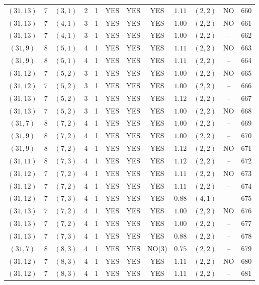 \begin{longtable}{|c|c|c|c|c|c|c|c|c|c|c|c|}
$(31,13)$ & 7 & $(3,1)$ & 2 & 1 & YES & YES & YES & $1.11$ & $(2,2)$ & NO & 660\\
$(31,13)$ & 7 & $(4,1)$ & 3 & 1 & YES & YES & YES & $1.00$ & $(2,2)$ & NO & 661\\
$(31,13)$ & 7 & $(4,1)$ & 3 & 1 & YES & YES & YES & $1.00$ & $(2,2)$ & -- & 662\\
$(31,9)$ & 8 & $(5,1)$ & 4 & 1 & YES & YES & YES & $1.11$ & $(2,2)$ & NO & 663\\
$(31,9)$ & 8 & $(5,1)$ & 4 & 1 & YES & YES & YES & $1.11$ & $(2,2)$ & -- & 664\\
$(31,12)$ & 7 & $(5,2)$ & 3 & 1 & YES & YES & YES & $1.00$ & $(2,2)$ & NO & 665\\
$(31,12)$ & 7 & $(5,2)$ & 3 & 1 & YES & YES & YES & $1.00$ & $(2,2)$ & -- & 666\\
$(31,13)$ & 7 & $(5,2)$ & 3 & 1 & YES & YES & YES & $1.12$ & $(2,2)$ & -- & 667\\
$(31,13)$ & 7 & $(5,2)$ & 3 & 1 & YES & YES & YES & $1.00$ & $(2,2)$ & NO & 668\\
$(31,7)$ & 8 & $(7,2)$ & 4 & 1 & YES & YES & YES & $1.00$ & $(2,2)$ & -- & 669\\
$(31,9)$ & 8 & $(7,2)$ & 4 & 1 & YES & YES & YES & $1.00$ & $(2,2)$ & -- & 670\\
$(31,9)$ & 8 & $(7,2)$ & 4 & 1 & YES & YES & YES & $1.12$ & $(2,2)$ & NO & 671\\
$(31,11)$ & 8 & $(7,3)$ & 4 & 1 & YES & YES & YES & $1.12$ & $(2,2)$ & -- & 672\\
$(31,12)$ & 7 & $(7,2)$ & 4 & 1 & YES & YES & YES & $1.11$ & $(2,2)$ & NO & 673\\
$(31,12)$ & 7 & $(7,2)$ & 4 & 1 & YES & YES & YES & $1.11$ & $(2,2)$ & -- & 674\\
$(31,12)$ & 7 & $(7,3)$ & 4 & 1 & YES & YES & YES & $0.88$ & $(4,1)$ & -- & 675\\
$(31,13)$ & 7 & $(7,2)$ & 4 & 1 & YES & YES & YES & $1.00$ & $(2,2)$ & NO & 676\\
$(31,13)$ & 7 & $(7,2)$ & 4 & 1 & YES & YES & YES & $1.00$ & $(2,2)$ & -- & 677\\
$(31,13)$ & 7 & $(7,3)$ & 4 & 1 & YES & YES & YES & $0.88$ & $(2,2)$ & -- & 678\\
$(31,7)$ & 8 & $(8,3)$ & 4 & 1 & YES & YES & NO(3) & $0.75$ & $(2,2)$ & -- & 679\\
$(31,12)$ & 7 & $(8,3)$ & 4 & 1 & YES & YES & YES & $1.11$ & $(2,2)$ & NO & 680\\
$(31,12)$ & 7 & $(8,3)$ & 4 & 1 & YES & YES & YES & $1.11$ & $(2,2)$ & -- & 681\\

\end{longtable}
